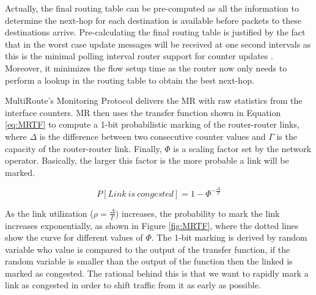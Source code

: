 Actually, the final routing table can be pre-computed as all the information to determine the next-hop for each destination is available before packets to these destinations arrive. Pre-calculating the final routing table is justified by the fact
that in the worst case update messages will be received at one second intervals as
this is the minimal polling interval router support for counter updates \cite{YaTG}.
Moreover, it minimizes the flow setup time as the router now only needs to
perform a lookup in the routing table to obtain the best next-hop.


MultiRoute's Monitoring Protocol delivers the MR with raw statistics from the interface counters. MR then uses the transfer function shown in Equation \ref{eq:MRTF} to compute a 1-bit probabilistic marking of the router-router links, where $\Delta$ is the difference between two consecutive counter values and $\Gamma$ is the capacity of the router-router link. Finally, $\Phi$ is a scaling factor set by the network operator. Basically, the larger this factor is the more probable a link will be marked.

 \begin{equation}
P[Link~is~congested] = 1 - \Phi^{-\frac{\Delta}{\Gamma}}
\label{eq:MRTF}
\end{equation}

As the link utilization ($\rho = \frac{\Delta}{\Gamma}$) increases, the
probability to mark the link increases exponentially, as shown in Figure
\ref{fig:MRTF}, where the dotted lines show the curve for different values of $\Phi$. The 1-bit marking is derived by random variable who value is compared to the output of the transfer function, if the random variable is smaller than the output of the function then the linked is marked as congested. The rational behind this is that we want to rapidly mark a link
as congested in order to shift traffic from it as early as possible. 


